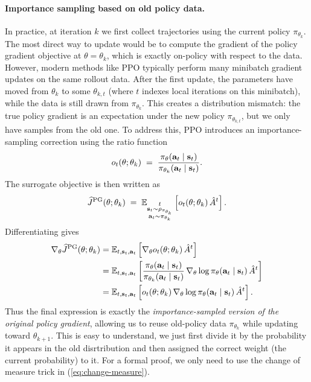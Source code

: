 \documentclass[11pt]{article}  %
\begin{document}
\paragraph{Importance sampling based on old policy data.}  
In practice, at iteration $k$ we first collect trajectories using the current policy $\pi_{\theta_k}$. The most direct way to update would be to compute the gradient of the policy gradient objective at $\theta = \theta_k$, which is exactly on-policy with respect to the data. However, modern methods like PPO typically perform many minibatch gradient updates on the same rollout data. After the first update, the parameters have moved from $\theta_k$ to some $\theta_{k,t}$ (where $t$ indexes local iterations on this minibatch), while the data is still drawn from $\pi_{\theta_k}$. This creates a distribution mismatch: the true policy gradient is an expectation under the new policy $\pi_{\theta_{k,t}}$, but we only have samples from the old one. To address this, PPO introduces an importance-sampling correction using the ratio function
\[
  o_t(\theta; \theta_k) \;=\; \frac{\pi_\theta(\mathbf{a}_t \mid \mathbf{s}_t)}{\pi_{\theta_k}(\mathbf{a}_t \mid \mathbf{s}_t)}.
\]
The surrogate objective is then written as
\[
  \widehat{J}^{\text{PG}}(\theta; \theta_k) \;=\;
  \mathbb{E}_{ \substack{t \\ \mathbf{s}_t \sim \rho_{\pi_{\theta_k}} \\ \mathbf{a}_t \sim \pi_{\theta_k}} }\left[ o_t(\theta; \theta_k)\, \hat{A}^t \right].
\]
Differentiating gives
\begin{align*}
  \nabla_\theta \widehat{J}^{\text{PG}}(\theta; \theta_k)
  &= \mathbb{E}_{t,\mathbf{s}_t,\mathbf{a}_t}\left[ \nabla_\theta o_t(\theta; \theta_k)\, \hat{A}^t \right] \\
  &= \mathbb{E}_{t,\mathbf{s}_t,\mathbf{a}_t}\left[ \frac{\pi_\theta(\mathbf{a}_t \mid \mathbf{s}_t)}{\pi_{\theta_k}(\mathbf{a}_t \mid \mathbf{s}_t)} \,
      \nabla_\theta \log \pi_\theta(\mathbf{a}_t \mid \mathbf{s}_t)\, \hat{A}^t \right] \\
  &= \mathbb{E}_{t,\mathbf{s}_t,\mathbf{a}_t}\left[ o_t(\theta; \theta_k)\,
      \nabla_\theta \log \pi_\theta(\mathbf{a}_t \mid \mathbf{s}_t)\, \hat{A}^t \right].
\end{align*}
Thus the final expression is exactly the \emph{importance-sampled version of the original policy gradient}, allowing us to reuse old-policy data $\pi_{\theta_k}$ while updating toward $\theta_{k+1}$.
This is easy to understand, we just first divide it by the probability it appears in the old disrtribution and then assigned the correct weight (the current probability) to it.
For a formal proof, we only need to use the change of measure trick in (\ref{eq:change-measure}).
\end{document}
